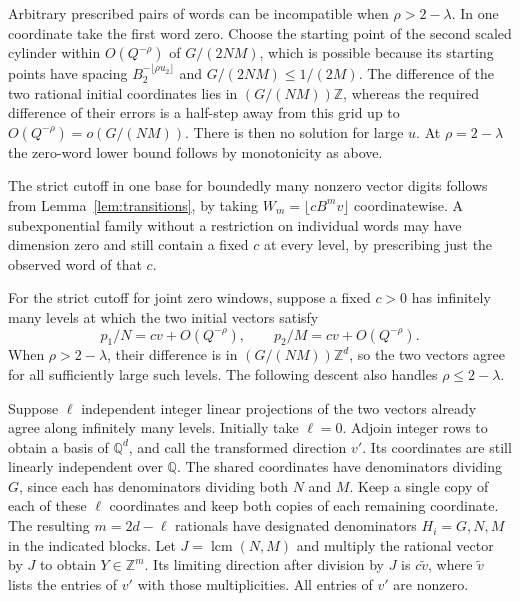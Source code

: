 \documentclass[11pt,reqno,a4paper]{amsart}
\theoremstyle{remark}
\begin{document}
Arbitrary prescribed pairs of words can be incompatible when
\(\rho>2-\lambda\). In one coordinate take the first word zero.
Choose the starting point of the second scaled cylinder within
\(O(Q^{-\rho})\) of \(G/(2NM)\), which is possible because its
starting points have spacing \(B_2^{-\lfloor\rho u_2\rfloor}\)
and \(G/(2NM)\leq1/(2M)\). The difference of the two rational
initial coordinates lies in \((G/(NM))\mathbb Z\), whereas the
required difference of their errors is a half-step away from
this grid up to \(O(Q^{-\rho})=o(G/(NM))\). There is then no
solution for large \(u\). At \(\rho=2-\lambda\) the zero-word
lower bound follows by monotonicity as above.

The strict cutoff in one base for boundedly many nonzero vector
digits follows from Lemma~\ref{lem:transitions}, by taking
\(W_m=\lfloor cB^mv\rfloor\) coordinatewise. A subexponential
family without a restriction on individual words may have
dimension zero and still contain a fixed \(c\) at every level,
by prescribing just the observed word of that \(c\).

For the strict cutoff for joint zero windows, suppose a fixed
\(c>0\) has infinitely many levels at which the two initial
vectors satisfy
\begin{equation}\label{eq:met-joint-primal}
  p_1/N=cv+O(Q^{-\rho}),\qquad p_2/M=cv+O(Q^{-\rho}).
\end{equation}
When \(\rho>2-\lambda\), their difference is in
\((G/(NM))\mathbb Z^d\), so the two vectors agree for all
sufficiently large such levels. The following descent also
handles \(\rho\leq2-\lambda\).

Suppose \(\ell\) independent integer linear projections of the
two vectors already agree along infinitely many levels. Initially
take \(\ell=0\). Adjoin integer rows to obtain a basis of
\(\mathbb Q^d\), and call the transformed direction \(v'\).
Its coordinates are still linearly independent over \(\mathbb Q\).
The shared coordinates have denominators dividing \(G\), since
each has denominators dividing both \(N\) and \(M\). Keep a single
copy of each of these \(\ell\) coordinates and keep both copies
of each remaining coordinate. The resulting \(m=2d-\ell\)
rationals have designated denominators \(H_i=G,N,M\) in the
indicated blocks. Let \(J=\operatorname{lcm}(N,M)\) and multiply
the rational vector by \(J\) to obtain \(Y\in\mathbb Z^m\).
Its limiting direction after division by \(J\) is \(c\widetilde v\),
where \(\widetilde v\) lists the entries of \(v'\) with those
multiplicities. All entries of \(v'\) are nonzero.
\end{document}

